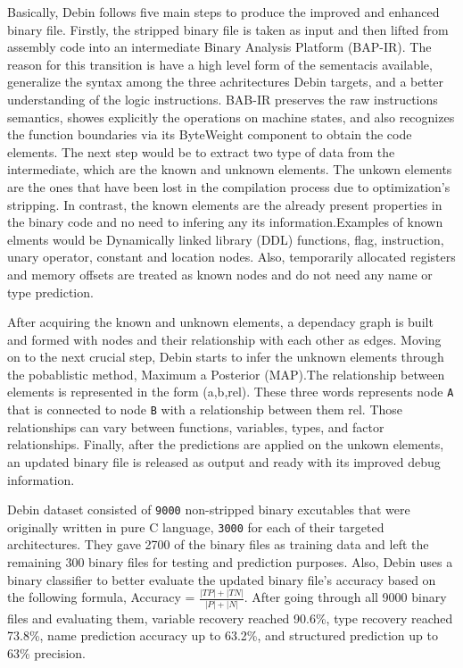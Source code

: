 \documentclass{article}
\begin{document}
Basically, Debin follows five main steps to produce the improved and enhanced binary file. Firstly, the stripped binary file is taken as input and then lifted from assembly code into an intermediate Binary Analysis Platform (BAP-IR). The reason for this transition is have a high level form of the sementacis available, generalize the
syntax among the three achritectures Debin targets, and a better understanding of the logic instructions. BAB-IR preserves the raw instructions semantics, showes explicitly the operations on machine states, and also recognizes the function boundaries via its ByteWeight component to obtain the code elements.
The next step would be to extract two type of data from the intermediate, which are the known and unknown elements. The unkown elements are the ones that have been lost in the compilation process due to optimization's stripping. In contrast, the known elements are the already present properties in the binary
code and no need to infering any its information.Examples of known elments would be Dynamically linked library (DDL) functions, flag, instruction, unary operator, constant and location nodes. Also, temporarily allocated registers and memory offsets are treated as known nodes and do not need any name or type prediction.

After acquiring the known and unknown elements, a dependacy graph is built and formed with nodes and their relationship with each other as edges.
Moving on to the next crucial step, Debin starts to infer the unknown elements through the pobablistic method, Maximum a Posterior (MAP).The relationship between elements is represented in the form (a,b,rel). These three words represents node \verb|A| that is connected to node \verb|B| with a relationship between them rel. Those relationships can vary between functions, variables, types, and factor relationships.
Finally, after the predictions are applied on the unkown elements, an updated binary file is released as output and ready with its improved debug information.

Debin dataset consisted of \verb|9000| non-stripped binary excutables that were originally written in pure C language, \verb|3000| for each of their targeted architectures. They gave 2700 of the binary files as training data and left the remaining 300 binary files for testing and prediction purposes.
Also, Debin uses a binary classifier to better evaluate the updated binary file's accuracy based on the following formula, Accuracy = ${\frac{|TP|+|TN|}{|P|+|N|}}$. After going through all 9000 binary files and evaluating them, variable recovery reached 90.6\%, type recovery reached 73.8\%, name prediction accuracy up to 63.2\%, and structured prediction up to 63\% precision.
\end{document}

